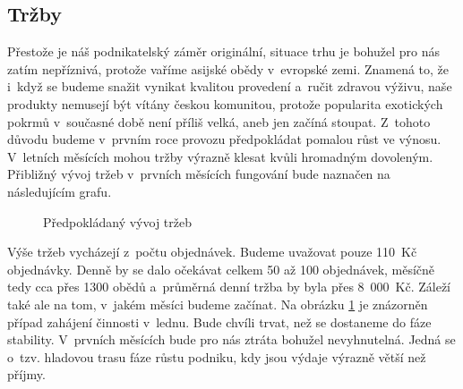 \subsection{Tržby}
Přestože je náš podnikatelský záměr originální, situace trhu je bohužel pro nás zatím nepříznivá, protože vaříme asijské obědy v~evropské zemi. Znamená to, že i~když se budeme snažit vynikat kvalitou provedení a~ručit zdravou výživu, naše produkty nemusejí být vítány českou komunitou, protože popularita exotických pokrmů v~současné době není příliš velká, aneb jen začíná stoupat. Z~tohoto důvodu budeme v~prvním roce provozu předpokládat pomalou růst ve výnosu. V~letních měsících mohou tržby výrazně klesat kvůli hromadným dovoleným. Přibližný vývoj tržeb v~prvních měsících fungování bude naznačen na následujícím grafu.

\begin{figure}[htbp]
\pgfplotsset{width=14.8cm,height=6cm}
\caption{Předpokládaný vývoj tržeb}
\label{vyvoj_trzeb}
\end{figure}

Výše tržeb vycházejí z~počtu objednávek. Budeme uvažovat pouze 110~Kč objednávky. Denně by se dalo očekávat celkem 50 až 100 objednávek, měsíčně tedy cca přes 1300 obědů a~průměrná denní tržba by byla přes 8~000~Kč. Záleží také ale na tom, v~jakém měsíci budeme začínat. Na obrázku \ref{vyvoj_trzeb} je znázorněn případ zahájení činnosti v~lednu. Bude chvíli trvat, než se dostaneme do fáze stability. V~prvních měsících bude pro nás ztráta bohužel nevyhnutelná. Jedná se o~tzv. hladovou trasu fáze růstu podniku, kdy jsou výdaje výrazně větší než příjmy.

